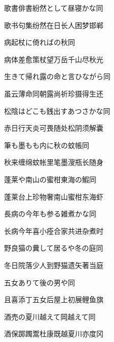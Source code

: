 \begin{haiku}
    {\FH 歌書俳書紛然として昼寝かな}\hfill{\FH 同}

    {\FK 歌书句集纷然在日长人困梦邯郸}
\end{haiku}

\begin{haiku}
    {\FH 病起杖に倚ればの秋}\hfill{\FH 同}

    {\FK 病体差愈策杖望万岳千山尽秋光}
\end{haiku}

\begin{haiku}
    {\FH 生きて帰れ露の命と言ひながら}\hfill{\FH 同}

    {\FK 虽云薄命同朝露尚祈珍摄得生还}
\end{haiku}

\begin{haiku}
    {\FH 松陰はどこも銭出すあつさかな}\hfill{\FH 同}

    {\FK 赤日行天炎可畏随处松阴须解囊}
\end{haiku}

\begin{haiku}
    {\FH 筆も墨もも内に秋の蚊帳}\hfill{\FH 同}

    {\FK 秋来缠绵蚊帐里笔墨溲瓶长随身}
\end{haiku}

\begin{haiku}
    {\FH 蓬莱や南山の蜜柑東海の鰕}\hfill{\FH 同}

    {\FK 蓬莱台上珍物奢南山蜜柑东海虾}
\end{haiku}

\begin{haiku}
    {\FH 長病の今年も参る雑煮かな}\hfill{\FH 同}

    {\FK 长病今年喜小痊合家共进杂煮时}
\end{haiku}

\begin{haiku}
    {\FH 野良猫の糞して居るや冬の庭}\hfill{\FH 同}

    {\FK 冬日院落少人到野猫遗矢著当庭}
\end{haiku}

\begin{haiku}
    {\FH 五女ありて後の男や}\hfill{\FH 同}

    {\FK 且喜添丁五女后屋上初展鲤鱼旗}
\end{haiku}

\begin{haiku}
    {\FH 酒売の夏川越えて岡越えて}\hfill{\FH 同}

    {\FK 酒保踯躅鬻杜康既越夏川亦度冈}
\end{haiku}

